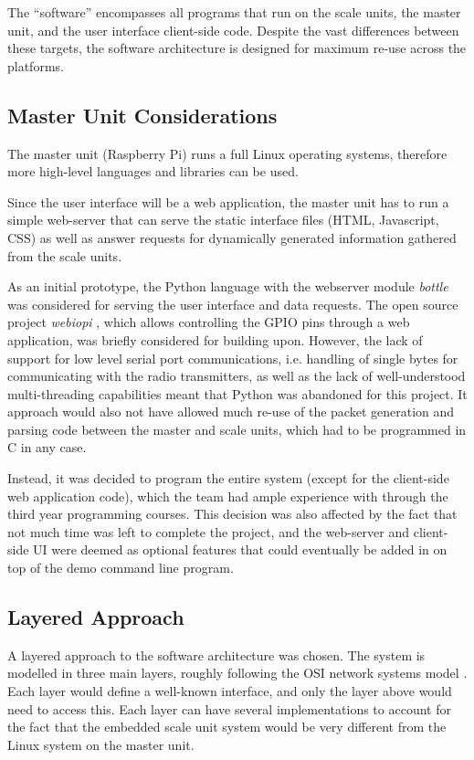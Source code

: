 The ``software'' encompasses all programs that run on the scale units, the master unit, and the user interface client-side code. Despite the vast differences between these targets, the software architecture is designed for maximum re-use across the platforms.

\subsection{Master Unit Considerations}
The master unit (Raspberry Pi) runs a full Linux operating systems, therefore more high-level languages and libraries can be used.

Since the user interface will be a web application, the master unit has to run a simple web-server that can serve the static interface files (HTML, Javascript, CSS) as well as answer requests for dynamically generated information gathered from the scale units.

As an initial prototype, the Python language with the webserver module \emph{bottle} \cite{bottle-py} was considered for serving the user interface and data requests. The open source project \emph{webiopi} \cite{webiopi}, which allows controlling the GPIO pins through a web application, was briefly considered for building upon. However, the lack of support for low level serial port communications, i.e. handling of single bytes for communicating with the radio transmitters, as well as the lack of well-understood multi-threading capabilities meant that Python was abandoned for this project. It approach would also not have allowed much re-use of the packet generation and parsing code between the master and scale units, which had to be programmed in C in any case.

Instead, it was decided to program the entire system (except for the client-side web application code), which the team had ample experience with through the third year programming courses. This decision was also affected by the fact that not much time was left to complete the project, and the web-server and client-side UI were deemed as optional features that could eventually be added in on top of the demo command line program.

\subsection{Layered Approach}
A layered approach to the software architecture was chosen. The system is modelled in three main layers, roughly following the OSI network systems model \cite{osi-model}. Each layer would define a well-known interface, and only the layer above would need to access this. Each layer can have several implementations to account for the fact that the embedded scale unit system would be very different from the Linux system on the master unit.

